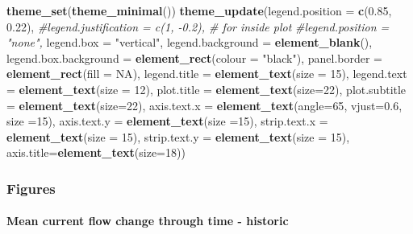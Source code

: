 \documentclass[
]{article}
\newenvironment{Shaded}{\begin{snugshade}}{\end{snugshade}}
\newcommand{\CommentTok}[1]{\textcolor[rgb]{0.56,0.35,0.01}{\textit{#1}}}
\newcommand{\DataTypeTok}[1]{\textcolor[rgb]{0.13,0.29,0.53}{#1}}
\newcommand{\DecValTok}[1]{\textcolor[rgb]{0.00,0.00,0.81}{#1}}
\newcommand{\FloatTok}[1]{\textcolor[rgb]{0.00,0.00,0.81}{#1}}
\newcommand{\KeywordTok}[1]{\textcolor[rgb]{0.13,0.29,0.53}{\textbf{#1}}}
\newcommand{\NormalTok}[1]{#1}
\newcommand{\OtherTok}[1]{\textcolor[rgb]{0.56,0.35,0.01}{#1}}
\newcommand{\StringTok}[1]{\textcolor[rgb]{0.31,0.60,0.02}{#1}}
\begin{document}
\begin{Shaded}
\begin{Highlighting}[]
\KeywordTok{theme_set}\NormalTok{(}\KeywordTok{theme_minimal}\NormalTok{())}
\KeywordTok{theme_update}\NormalTok{(}\DataTypeTok{legend.position =} \KeywordTok{c}\NormalTok{(}\FloatTok{0.85}\NormalTok{, }\FloatTok{0.22}\NormalTok{),}
             \CommentTok{#legend.justification = c(1, -0.2), # for inside plot}
             \CommentTok{#legend.position = "none",}
             \DataTypeTok{legend.box =} \StringTok{"vertical"}\NormalTok{,}
             \DataTypeTok{legend.background =} \KeywordTok{element_blank}\NormalTok{(),}
             \DataTypeTok{legend.box.background =} \KeywordTok{element_rect}\NormalTok{(}\DataTypeTok{colour =} \StringTok{"black"}\NormalTok{),}
             \DataTypeTok{panel.border =} \KeywordTok{element_rect}\NormalTok{(}\DataTypeTok{fill =} \OtherTok{NA}\NormalTok{),}
             \DataTypeTok{legend.title =} \KeywordTok{element_text}\NormalTok{(}\DataTypeTok{size =} \DecValTok{15}\NormalTok{),}
             \DataTypeTok{legend.text =} \KeywordTok{element_text}\NormalTok{(}\DataTypeTok{size =} \DecValTok{12}\NormalTok{),}
             \DataTypeTok{plot.title =} \KeywordTok{element_text}\NormalTok{(}\DataTypeTok{size=}\DecValTok{22}\NormalTok{),}
             \DataTypeTok{plot.subtitle =} \KeywordTok{element_text}\NormalTok{(}\DataTypeTok{size=}\DecValTok{22}\NormalTok{),}
             \DataTypeTok{axis.text.x =} \KeywordTok{element_text}\NormalTok{(}\DataTypeTok{angle=}\DecValTok{65}\NormalTok{, }\DataTypeTok{vjust=}\FloatTok{0.6}\NormalTok{, }\DataTypeTok{size =}\DecValTok{15}\NormalTok{),}
             \DataTypeTok{axis.text.y =} \KeywordTok{element_text}\NormalTok{(}\DataTypeTok{size =}\DecValTok{15}\NormalTok{),}
             \DataTypeTok{strip.text.x =} \KeywordTok{element_text}\NormalTok{(}\DataTypeTok{size =} \DecValTok{15}\NormalTok{),}
             \DataTypeTok{strip.text.y =} \KeywordTok{element_text}\NormalTok{(}\DataTypeTok{size =} \DecValTok{15}\NormalTok{),}
             \DataTypeTok{axis.title=}\KeywordTok{element_text}\NormalTok{(}\DataTypeTok{size=}\DecValTok{18}\NormalTok{))}
\end{Highlighting}
\end{Shaded}

\hypertarget{figures}{%
\subsubsection{Figures}\label{figures}}

\hypertarget{mean-current-flow-change-through-time---historic}{%
\paragraph{Mean current flow change through time -
historic}\label{mean-current-flow-change-through-time---historic}}
\end{document}
